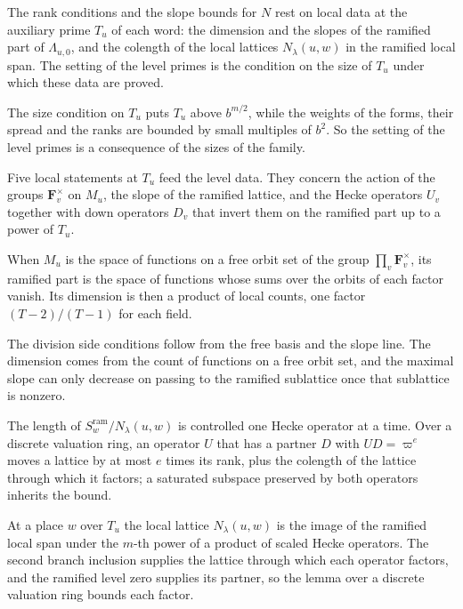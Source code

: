The rank conditions and the slope bounds for $N$ rest on local data at the
auxiliary prime $T_u$ of each word: the dimension and the slopes of the ramified
part of $\Lambda_{u,0}$, and the colength of the local lattices
$N_\lambda(u,w)$ in the ramified local span. The setting of the level primes is
the condition on the size of $T_u$ under which these data are proved.

The size condition on $T_u$ puts $T_u$ above $b^{m/2}$, while the weights of
the forms, their spread and the ranks are bounded by small multiples of $b^2$.
So the setting of the level primes is a consequence of the sizes of the family.

Five local statements at $T_u$ feed the level data. They concern the action of
the groups $\mathbf F_v^\times$ on $M_u$, the slope of the ramified lattice,
and the Hecke operators $U_v$ together with down operators $D_v$ that invert
them on the ramified part up to a power of $T_u$.

When $M_u$ is the space of functions on a free orbit set of the group
$\prod_v\mathbf F_v^\times$, its ramified part is the space of functions whose
sums over the orbits of each factor vanish. Its dimension is then a product of
local counts, one factor $(T-2)/(T-1)$ for each field.

The division side conditions follow from the free basis and the slope line.
The dimension comes from the count of functions on a free orbit set, and the
maximal slope can only decrease on passing to the ramified sublattice once
that sublattice is nonzero.

The length of $S^{\mathrm{ram}}_w/N_\lambda(u,w)$ is controlled one Hecke
operator at a time. Over a discrete valuation ring, an operator $U$ that has a
partner $D$ with $UD=\varpi^e$ moves a lattice by at most $e$ times its rank,
plus the colength of the lattice through which it factors; a saturated
subspace preserved by both operators inherits the bound.

At a place $w$ over $T_u$ the local lattice $N_\lambda(u,w)$ is the image of
the ramified local span under the $m$-th power of a product of scaled Hecke
operators. The second branch inclusion supplies the lattice through which each
operator factors, and the ramified level zero supplies its partner, so the
lemma over a discrete valuation ring bounds each factor.

